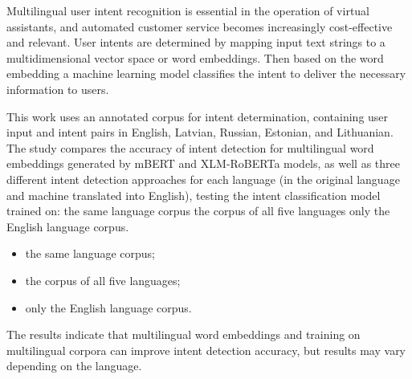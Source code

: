 Multilingual user intent recognition is essential in the operation of virtual assistants, and automated customer service becomes increasingly cost-effective and relevant. User intents are determined by mapping input text strings to a multidimensional vector space or word embeddings. Then based on the word embedding a machine learning model classifies the intent to deliver the necessary information to users.

This work uses an annotated corpus for intent determination, containing user input and intent pairs in English, Latvian, Russian, Estonian, and Lithuanian. The study compares the accuracy of intent detection for multilingual word embeddings generated by mBERT and XLM-RoBERTa models, as well as three different intent detection approaches for each language (in the original language and machine translated into English), testing the intent classification model trained on:
the same language corpus
the corpus of all five languages
only the English language corpus.

\begin{itemize}
    \item the same language corpus;
    \item the corpus of all five languages;
    \item only the English language corpus.
\end{itemize}

The results indicate that multilingual word embeddings and training on multilingual corpora can improve intent detection accuracy, but results may vary depending on the language.



